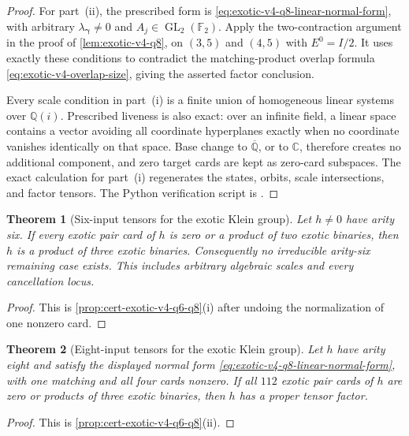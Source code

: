 \documentclass[11pt,letterpaper,onecolumn]{article}
\theoremstyle{plain}
\newtheorem{theorem}{Theorem}[section]
\theoremstyle{definition}
\theoremstyle{remark}
\newcommand{\Ftwo}{\mathbb F_2}
\newcommand{\GL}{\operatorname{GL}}
\begin{document}
\begin{proof}
For part~\textnormal{(ii)}, the prescribed form is
\cref{eq:exotic-v4-q8-linear-normal-form}, with arbitrary
\(\lambda_{\boldsymbol\gamma}\ne0\) and \(A_j\in\GL_2(\Ftwo)\).
Apply the two-contraction argument in the proof of \cref{lem:exotic-v4-q8},
on \((3,5)\) and \((4,5)\) with \(E^0=I/2\). It uses exactly these
conditions to contradict the matching-product overlap formula
\cref{eq:exotic-v4-overlap-size}, giving the asserted factor conclusion.

Every scale condition in part~\textnormal{(i)} is a finite union of homogeneous
linear systems over \(\mathbb Q(i)\).  Prescribed liveness is also exact:
over an infinite field, a linear space contains a vector avoiding all
coordinate hyperplanes exactly when no coordinate vanishes identically on
that space.  Base change to \(\overline{\mathbb Q}\), or to
\(\mathbb C\), therefore creates no additional component, and zero target
cards are kept as zero-card subspaces.  The exact calculation for part~\textnormal{(i)} regenerates the states,
orbits, scale intersections, and factor tensors.
The Python verification script is
.
\end{proof}

\begin{theorem}[Six-input tensors for the exotic Klein group]
\label{thm:cert-interface-exotic-v4-q6}
Let \(h\ne0\) have arity six.  If every exotic pair card of \(h\) is zero
or a product of two exotic binaries, then \(h\) is a product of three
exotic binaries.  Consequently no irreducible arity-six remaining case exists.
This includes arbitrary algebraic scales and every cancellation locus.
\end{theorem}

\begin{proof}
This is \cref{prop:cert-exotic-v4-q6-q8}\textnormal{(i)} after undoing the
normalization of one nonzero card.
\end{proof}

\begin{theorem}[Eight-input tensors for the exotic Klein group]
\label{thm:cert-interface-exotic-v4-q8}
Let \(h\) have arity eight and satisfy the displayed normal form \cref{eq:exotic-v4-q8-linear-normal-form}, with one matching and
all four cards nonzero.  If all \(112\) exotic
pair cards of \(h\) are zero or products of three exotic binaries, then
\(h\) has a proper tensor factor.  
\end{theorem}

\begin{proof}
This is \cref{prop:cert-exotic-v4-q6-q8}\textnormal{(ii)}.
\end{proof}
\end{document}
